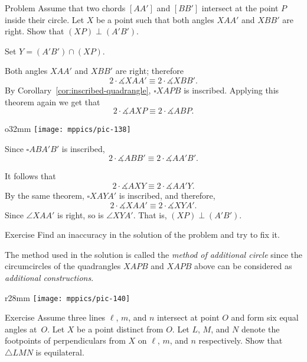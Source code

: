 \begin{thm*}{Problem}
 Assume that two chords $[AA']$ and $[BB']$ intersect at the point $P$ inside their circle.
Let $X$ be a point such that both angles $XAA'$ and $XBB'$ are right.
Show that $(XP)\perp(A'B')$.
\end{thm*}

Set $Y=(A'B')\cap (XP)$.

Both angles $XAA'$ and $XBB'$ are right;
therefore
\[2\cdot\measuredangle XAA'
\equiv
2\cdot\measuredangle XBB'.\]
By Corollary~\ref{cor:inscribed-quadrangle},  $\square XAPB$ is inscribed.
Applying this theorem again we get that
\[2\cdot\measuredangle AXP
\equiv
2\cdot\measuredangle ABP.\]

\begin{wrapfigure}[9]{o}{32mm}
\vskip-7mm
\centering
\texttt{[image: mppics/pic-138]}
\end{wrapfigure}

Since $\square ABA'B'$ is inscribed, 
\[2\cdot\measuredangle ABB'
\equiv
2\cdot\measuredangle AA'B'.\]

It follows that 
\[2\cdot\measuredangle AXY
\equiv
2\cdot\measuredangle AA'Y.\]
By the same theorem, $\square XAYA'$ is inscribed,
and
therefore, 
\[2\cdot\measuredangle XAA'
\equiv
2\cdot\measuredangle XYA'.\]
Since $\angle XAA'$ is right, 
so is $\angle XYA'$. 
That is, $(XP)\perp(A'B')$.
\qeds

\begin{thm}{Exercise}\label{ex:inaccuracy}
Find an inaccuracy in the solution of the problem and try to fix it.
\end{thm}

The method used in the solution 
is called the \textit{method of additional circle}
since the circumcircles of the quadrangles $XAPB$ and $XAPB$ 
 above can be considered as \textit{additional constructions}. 

{

\begin{wrapfigure}{r}{28mm}
\vskip-8mm
\centering
\texttt{[image: mppics/pic-140]}
\end{wrapfigure}

\begin{thm}{Exercise}\label{ex:equilateral-2}
Assume three lines $\ell$, $m$, and $n$ intersect at point $O$ and form six equal angles at~$O$. 
Let $X$ be a point distinct from $O$.
Let $L$, $M$, and $N$ denote the footpoints of perpendiculars from $X$ on $\ell$, $m$, and $n$ respectively.
Show that $\triangle LMN$ is equilateral.
\end{thm}
}

